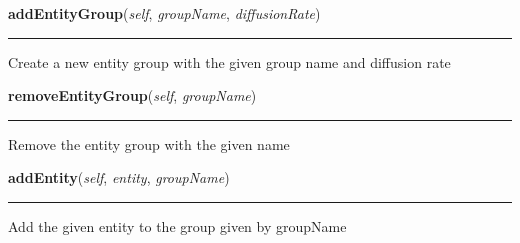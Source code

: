     \label{Birds:GameState:GameState:addEntityGroup}

    \vspace{0.5ex}

\hspace{.8\funcindent}\begin{boxedminipage}{\funcwidth}

    \raggedright \textbf{addEntityGroup}(\textit{self}, \textit{groupName}, \textit{diffusionRate})

    \vspace{-1.5ex}

    \rule{\textwidth}{0.5\fboxrule}
\setlength{\parskip}{2ex}
    Create a new entity group with the given group name and diffusion rate

\setlength{\parskip}{1ex}
    \end{boxedminipage}

    \label{Birds:GameState:GameState:removeEntityGroup}

    \vspace{0.5ex}

\hspace{.8\funcindent}\begin{boxedminipage}{\funcwidth}

    \raggedright \textbf{removeEntityGroup}(\textit{self}, \textit{groupName})

    \vspace{-1.5ex}

    \rule{\textwidth}{0.5\fboxrule}
\setlength{\parskip}{2ex}
    Remove the entity group with the given name

\setlength{\parskip}{1ex}
    \end{boxedminipage}

    \label{Birds:GameState:GameState:addEntity}

    \vspace{0.5ex}

\hspace{.8\funcindent}\begin{boxedminipage}{\funcwidth}

    \raggedright \textbf{addEntity}(\textit{self}, \textit{entity}, \textit{groupName})

    \vspace{-1.5ex}

    \rule{\textwidth}{0.5\fboxrule}
\setlength{\parskip}{2ex}
    Add the given entity to the group given by groupName

\setlength{\parskip}{1ex}
    \end{boxedminipage}

